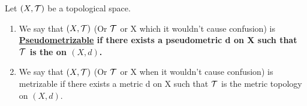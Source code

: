 \newcommand{\Pseudometrizable}[0]{
    \bf \hyperref[def:Pseudometrizable]{Pseudometrizable} \rm
}
\newcommand{\Metrizable}[0]{
    \bf \hyperref[df:Pseudometrizable]{Metrizable} \rm 
}
\begin{df}
    \label{def:Pseudometrizable}
    Let $(X,\mathcal{T})$ be a topological space. 
    \begin{enumerate}
        \item We say that $(X,\mathcal{T})$ (Or $\mathcal{T}$ or X which it wouldn't cause confusion) is \Pseudometrizable if there exists a pseudometric d on X such that $\mathcal{T}$ is the \PseudometricInducedTopology on $(X,d)$. 
        \item We say that $(X,\mathcal{T})$ (Or $\mathcal{T}$ or X when it wouldn't cause confusion) is metrizable if there exists a metric d on X such that $\mathcal{T}$ is the metric topology on $(X,d)$. 
    \end{enumerate}
\end{df}